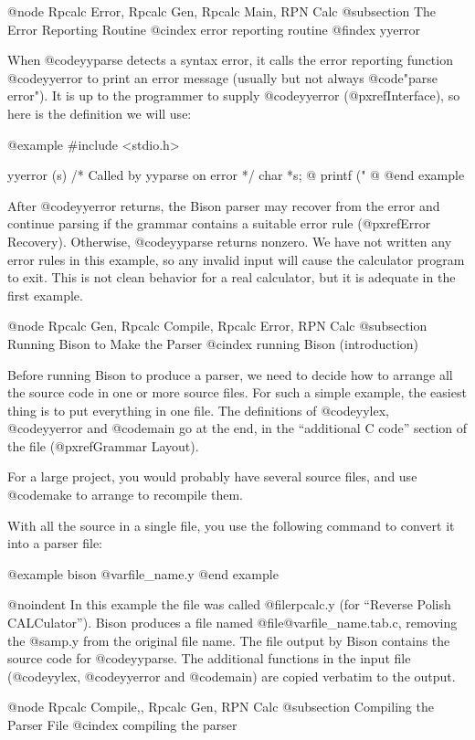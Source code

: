 {{{@node Rpcalc Error, Rpcalc Gen, Rpcalc Main, RPN Calc
@subsection The Error Reporting Routine
@cindex error reporting routine
@findex yyerror

When @code{yyparse} detects a syntax error, it calls the error reporting
function @code{yyerror} to print an error message (usually but not always
@code{"parse error"}).  It is up to the programmer to supply @code{yyerror}
(@pxref{Interface}), so here is the definition we will use:

@example
#include <stdio.h>

yyerror (s)  /* Called by yyparse on error */
     char *s;
@{
  printf ("%
@}
@end example

After @code{yyerror} returns, the Bison parser may recover from the error
and continue parsing if the grammar contains a suitable error rule
(@pxref{Error Recovery}).  Otherwise, @code{yyparse} returns nonzero.  We
have not written any error rules in this example, so any invalid input will
cause the calculator program to exit.  This is not clean behavior for a
real calculator, but it is adequate in the first example.

@node Rpcalc Gen, Rpcalc Compile, Rpcalc Error, RPN Calc
@subsection Running Bison to Make the Parser
@cindex running Bison (introduction)

Before running Bison to produce a parser, we need to decide how to arrange
all the source code in one or more source files.  For such a simple example,
the easiest thing is to put everything in one file.  The definitions of
@code{yylex}, @code{yyerror} and @code{main} go at the end, in the
``additional C code'' section of the file (@pxref{Grammar Layout}).

For a large project, you would probably have several source files, and use
@code{make} to arrange to recompile them.

With all the source in a single file, you use the following command to
convert it into a parser file:

@example
bison @var{file_name}.y
@end example

@noindent
In this example the file was called @file{rpcalc.y} (for ``Reverse Polish
CALCulator'').  Bison produces a file named @file{@var{file_name}.tab.c},
removing the @samp{.y} from the original file name. The file output by
Bison contains the source code for @code{yyparse}.  The additional
functions in the input file (@code{yylex}, @code{yyerror} and @code{main})
are copied verbatim to the output.

@node Rpcalc Compile,, Rpcalc Gen, RPN Calc
@subsection Compiling the Parser File
@cindex compiling the parser

}}}
